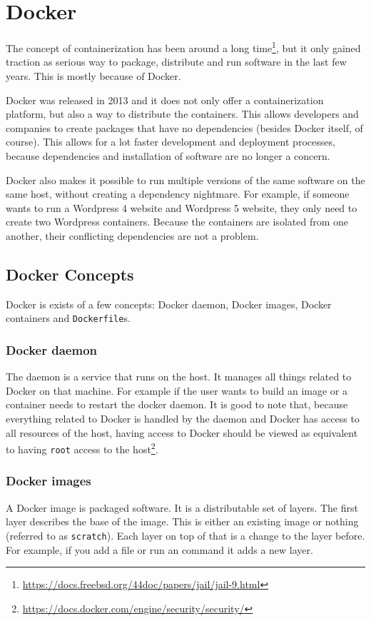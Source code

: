 \section{Docker}
The concept of containerization has been around a long time\footnote{\url{https://docs.freebsd.org/44doc/papers/jail/jail-9.html}}, but it only gained traction as serious way to package, distribute and run software in the last few years. This is mostly because of Docker.

\hfill

Docker was released in 2013 and it does not only offer a containerization platform, but also a way to distribute the containers. This allows developers and companies to create packages that have no dependencies (besides Docker itself, of course). This allows for a lot faster development and deployment processes, because dependencies and installation of software are no longer a concern.

\hfill

Docker also makes it possible to run multiple versions of the same software on the same host, without creating a dependency nightmare. For example, if someone wants to run a Wordpress 4 website and Wordpress 5 website, they only need to create two Wordpress containers. Because the containers are isolated from one another, their conflicting dependencies are not a problem.

\subsection{Docker Concepts}
Docker is exists of a few concepts: Docker daemon, Docker images, Docker containers and \lstinline{Dockerfile}s.

\subsubsection{Docker daemon}
The daemon is a service that runs on the host. It manages all things related to Docker on that machine. For example if the user wants to build an image or a container needs to restart the docker daemon. It is good to note that, because everything related to Docker is handled by the daemon and Docker has access to all resources of the host, having access to Docker should be viewed as equivalent to having \lstinline{root} access to the host\footnote{\url{https://docs.docker.com/engine/security/security/}}.

\subsubsection{Docker images}
A Docker image is packaged software. It is a distributable set of layers. The first layer describes the base of the image. This is either an existing image or nothing (referred to as \lstinline{scratch}). Each layer on top of that is a change to the layer before. For example, if you add a file or run an command it adds a new layer.

